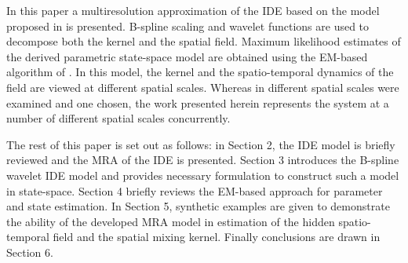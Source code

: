 \documentclass[11pt,draftcls,onecolumn,peerreview]{IEEEtran}
\begin{document}
In this paper a multiresolution approximation of the IDE based on the model proposed in \cite{Dewar2009} is presented. B-spline scaling and wavelet functions are used to decompose both the kernel and the spatial field. Maximum likelihood estimates of the derived parametric state-space model are obtained using the EM-based algorithm of  \cite{Dewar2009}.  In this model, the kernel and the spatio-temporal dynamics of the field are viewed at different spatial scales. Whereas in \cite{Scerri2009} different spatial scales were examined and one chosen, the work presented herein represents the system at a number of different spatial scales concurrently.


  The rest of this paper is set out as follows: in Section 2, the IDE model is briefly reviewed and the MRA of the IDE is presented. Section 3 introduces the B-spline wavelet IDE model and provides necessary formulation  to construct such a model in state-space. Section 4 briefly reviews the EM-based approach for parameter and state estimation. In Section 5, synthetic examples are given to demonstrate the ability of the developed MRA model in estimation of the hidden spatio-temporal field and the spatial mixing kernel. Finally conclusions are drawn in Section 6.





 



\end{document}
